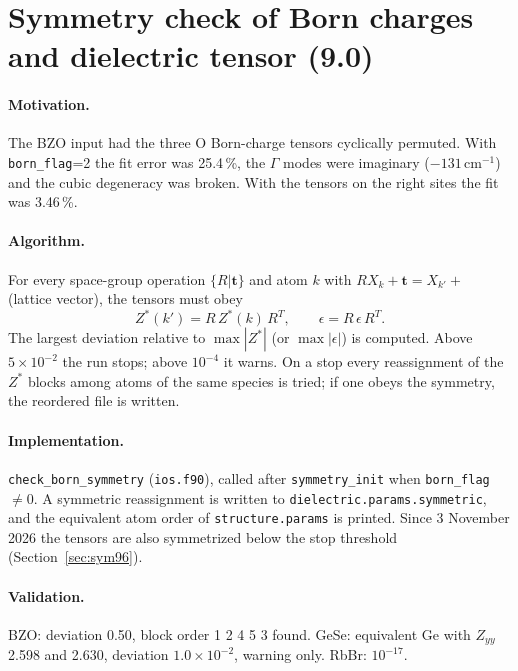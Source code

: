 \documentclass[11pt,a4paper]{article}
\newcommand{\bt}{\mathbf t}
\newcommand{\code}[1]{\texttt{#1}}
\begin{document}
\section{Symmetry check of Born charges and dielectric tensor (9.0)}
\paragraph{Motivation.} The BZO input had the three O Born-charge tensors cyclically permuted. With
\code{born\_flag}=2 the fit error was 25.4\,\%, the $\Gamma$ modes were imaginary ($-131$\,cm$^{-1}$) and the
cubic degeneracy was broken. With the tensors on the right sites the fit was 3.46\,\%.

\paragraph{Algorithm.} For every space-group operation $\{R|\bt\}$ and atom $k$ with
$RX_k+\bt=X_{k'}+$ (lattice vector), the tensors must obey
\begin{equation}
Z^*(k')=R\,Z^*(k)\,R^T,\qquad \epsilon=R\,\epsilon\,R^T .
\end{equation}
The largest deviation relative to $\max|Z^*|$ (or $\max|\epsilon|$) is computed. Above $5\times10^{-2}$
the run stops; above $10^{-4}$ it warns. On a stop every reassignment of the $Z^*$ blocks among atoms of
the same species is tried; if one obeys the symmetry, the reordered file is written.

\paragraph{Implementation.} \code{check\_born\_symmetry} (\code{ios.f90}), called after
\code{symmetry\_init} when \code{born\_flag}$\neq0$. A symmetric reassignment is written to
\code{dielectric.params.symmetric}, and the equivalent atom order of \code{structure.params} is printed.
Since 3 November 2026 the tensors are also symmetrized below the stop threshold (Section~\ref{sec:sym96}).

\paragraph{Validation.} BZO: deviation 0.50, block order 1 2 4 5 3 found. GeSe: equivalent Ge with
$Z_{yy}$ 2.598 and 2.630, deviation $1.0\times10^{-2}$, warning only. RbBr: $10^{-17}$.
\end{document}
